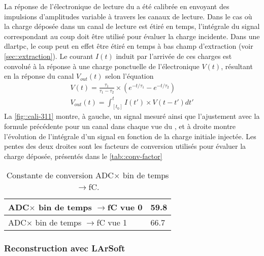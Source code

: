         La réponse de l'électronique de lecture du \TOO{} a été calibrée en envoyant des impulsions d'amplitudes variable à travers les canaux de lecture. Dans le cas où la charge déposée dans un canal de lecture est étiré en temps, l'intégrale du signal correspondant au coup doit être utilisé pour évaluer la charge incidente. Dans une \gls{dlartpc}, le coup peut en effet être étiré en temps à bas champ d'extraction (voir \autoref{sec::extraction}). Le courant $I(t)$ induit par l'arrivée de ces charges est convolué à la réponse à une charge ponctuelle de l'électronique $V(t)$, résultant en la réponse du canal $V_{out}(t)$ selon l'équation
        \begin{eqnarray}\label{eq::resp-function}
          V(t) = \frac{\tau_1}{\tau_1-\tau_2}\times\left(e^{-t/\tau_1}-e^{-t/\tau_2}\right) \\ 
          V_{out}(t) = \int_{[t_0]}^{t} I(t')\times V(t-t')dt'
        \end{eqnarray}
        La \autoref{fig::cali-311} montre, à gauche, un signal mesuré ainsi que l'ajustement avec la formule précédente pour un canal dans chaque vue du \TOO, et à droite montre l'évolution de l'intégrale d'un signal en fonction de la charge initiale injectée. Les pentes des deux droites sont les facteurs de conversion utilisés pour évaluer la charge déposée, présentés dans le \autoref{tab::conv-factor}
        \begin{table}[]
          \centering
          \begin{tabular}{|l|l|}
            \hline
            ADC$\times$ bin de temps $\to$\si{\femto\coulomb} vue 0 & 59.8 \\ \hline \hline
            ADC$\times$ bin de temps $\to$\si{\femto\coulomb} vue 1 & 66.7 \\ \hline
          \end{tabular}
          \caption[Constante de conversion ADC$\times$ bin de temps $\to$\si{\femto\coulomb}]{\label{tab::conv-factor}Constante de conversion ADC$\times$ bin de temps $\to$\si{\femto\coulomb}.}
        \end{table}

      \subsubsection{Reconstruction avec LArSoft}

